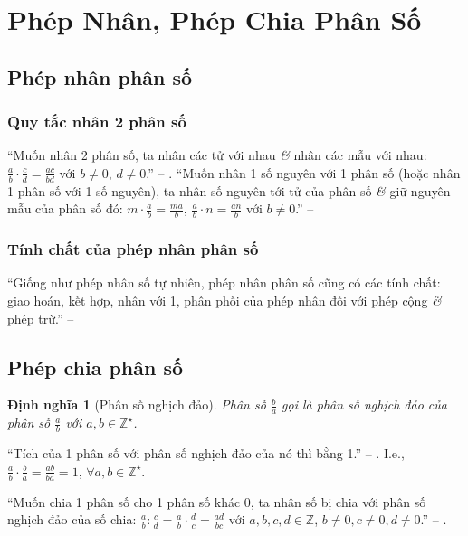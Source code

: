 \documentclass[oneside]{book}
\numberwithin{equation}{section}
\newtheorem{dinhnghia}{Định nghĩa}[section]
\begin{document}
\section{Phép Nhân, Phép Chia Phân Số}

\subsection{Phép nhân phân số}

\subsubsection{Quy tắc nhân 2 phân số}
``Muốn nhân 2 phân số, ta nhân các tử với nhau \textit{\&} nhân các mẫu với nhau: $\frac{a}{b}\cdot\frac{c}{d} = \frac{ac}{bd}$ với $b\ne 0$, $d\ne 0$.'' -- \cite[p. 40]{Thai_Anh_Dat_Ha_Loan_Nam_Quang_Toan_6_tap_2}. ``Muốn nhân 1 số nguyên với 1 phân số (hoặc nhân 1 phân số với 1 số nguyên), ta nhân số nguyên tới tử của phân số \textit{\&} giữ nguyên mẫu của phân số đó: $m\cdot\frac{a}{b} = \frac{ma}{b}$, $\frac{a}{b}\cdot n = \frac{an}{b}$ với $b\ne 0$.'' -- \cite[p. 41]{Thai_Anh_Dat_Ha_Loan_Nam_Quang_Toan_6_tap_2}

\subsubsection{Tính chất của phép nhân phân số}
``Giống như phép nhân số tự nhiên, phép nhân phân số cũng có các tính chất: giao hoán, kết hợp, nhân với 1, phân phối của phép nhân đối với phép cộng \textit{\&} phép trừ.'' -- \cite[p. 41]{Thai_Anh_Dat_Ha_Loan_Nam_Quang_Toan_6_tap_2}

\subsection{Phép chia phân số}
 
\begin{dinhnghia}[Phân số nghịch đảo]
	Phân số $\frac{b}{a}$ gọi là \emph{phân số nghịch đảo} của phân số $\frac{a}{b}$ với $a,b\in\mathbb{Z}^\star$.
\end{dinhnghia}
``Tích của 1 phân số với phân số nghịch đảo của nó thì bằng 1.'' -- \cite[p. 42]{Thai_Anh_Dat_Ha_Loan_Nam_Quang_Toan_6_tap_2}. I.e., $\frac{a}{b}\cdot\frac{b}{a} = \frac{ab}{ba} = 1$, $\forall a,b\in\mathbb{Z}^\star$.

``Muốn chia 1 phân số cho 1 phân số khác 0, ta nhân số bị chia với phân số nghịch đảo của số chia: $\frac{a}{b}:\frac{c}{d} = \frac{a}{b}\cdot\frac{d}{c} = \frac{ad}{bc}$ với $a,b,c,d\in\mathbb{Z}$, $b\ne 0,c\ne 0,d\ne 0$.'' -- \cite[p. 42]{Thai_Anh_Dat_Ha_Loan_Nam_Quang_Toan_6_tap_2}.
\end{document}
